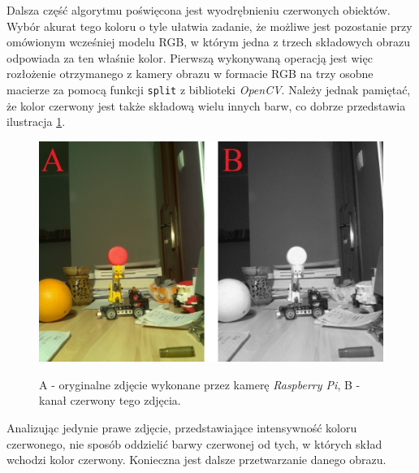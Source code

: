 Dalsza część algorytmu poświęcona jest wyodrębnieniu czerwonych obiektów. Wybór akurat tego koloru o tyle ułatwia zadanie, że możliwe jest pozostanie przy omówionym wcześniej modelu RGB, w którym jedna z trzech składowych obrazu odpowiada za ten właśnie kolor. Pierwszą wykonywaną operacją jest więc rozłożenie otrzymanego z kamery obrazu w formacie RGB na trzy osobne macierze za pomocą funkcji \texttt{split} z biblioteki \textit{OpenCV}. Należy jednak pamiętać, że kolor czerwony jest także składową wielu innych barw, co dobrze przedstawia ilustracja \ref{red}.
\begin{figure}[H]
\begin{center}
\includegraphics[scale=0.42]{imgs/imgBase+Red.jpg}
\caption[Uzyskany kanał czerwony wraz z oryginalny obrazem.]\small{A - oryginalne zdjęcie wykonane przez kamerę \textit{Raspberry Pi}, B - kanał czerwony tego zdjęcia.}
\label{red}
\end{center}
\end{figure}
Analizując jedynie prawe zdjęcie, przedstawiające intensywność koloru czerwonego, nie sposób oddzielić barwy czerwonej od tych, w których skład wchodzi kolor czerwony. Konieczna jest dalsze przetwarzanie danego obrazu.

